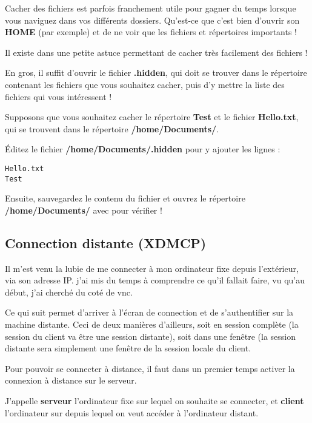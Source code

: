 \documentclass[a4paper,twoside]{article}
\begin{document}
Cacher des fichiers est parfois franchement utile pour gagner du temps lorsque vous naviguez dans vos différents dossiers. Qu'est-ce que c'est bien d'ouvrir son \textbf{HOME} (par exemple) et de ne voir que les fichiers et répertoires importants !

Il existe dans  une petite astuce permettant de cacher très facilement des fichiers !

En gros, il suffit d'ouvrir le fichier \textbf{.hidden}, qui doit se trouver dans le répertoire contenant les fichiers que vous souhaitez cacher, puis d'y mettre la liste des fichiers qui vous intéressent !

Supposons que vous souhaitez cacher le répertoire \textbf{Test} et le fichier \textbf{Hello.txt}, qui se trouvent dans le répertoire \textbf{/home/Documents/}.

Éditez le fichier \textbf{/home/Documents/.hidden} pour y ajouter les lignes :
\begin{verbatim}
Hello.txt
Test
\end{verbatim}

Ensuite, sauvegardez le contenu du fichier et ouvrez le répertoire \textbf{/home/Documents/} avec  pour vérifier !

\subsection{Connection distante (XDMCP)}
Il m'est venu la lubie de me connecter à mon ordinateur fixe depuis l'extérieur, via son adresse IP. j'ai mis du temps à comprendre ce qu'il fallait faire, vu qu'au début, j'ai cherché du coté de vnc.

Ce qui suit permet d'arriver à l'écran de connection et de s'authentifier sur la machine distante. Ceci de deux manières d'ailleurs, soit en session complète (la session du client va être une session distante), soit dans une fenêtre (la session distante sera simplement une fenêtre de la session locale du client.

\bigskip

Pour pouvoir se connecter à distance, il faut dans un premier temps activer la connexion à distance sur le serveur.

\begin{remarque}
J'appelle \textbf{serveur} l'ordinateur fixe sur lequel on souhaite se connecter, et \textbf{client} l'ordinateur sur depuis lequel on veut accéder à l'ordinateur distant.
\end{remarque}
\end{document}
